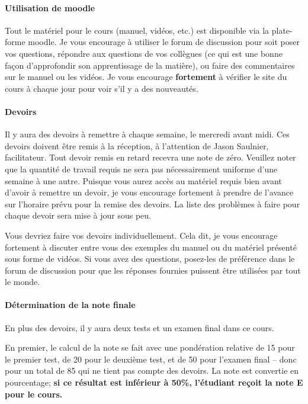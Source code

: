 \documentclass[11pt]{article}
\begin{document}
\paragraph*{Utilisation de moodle}  Tout le matériel pour le cours (manuel, vidéos, etc.) est disponible via la plate-forme moodle. 
Je vous encourage à utiliser le forum de discussion pour soit poser vos questions, répondre aux questions de vos collègues
(ce qui est une bonne façon d'approfondir son apprentissage de la matière), ou faire des commentaires sur le manuel ou les vidéos.
Je vous encourage \textbf{fortement} à vérifier le site du cours à chaque jour pour voir s'il y a des nouveautés.

\paragraph*{Devoirs} Il y aura des devoirs à remettre à chaque semaine, le mercredi avant midi. 
Ces devoirs doivent être remis à la réception, à l'attention de Jason Saulnier, facilitateur.
 Tout devoir remis en retard recevra une note de zéro.   
 Veuillez noter que la quantité de travail requis ne sera pas nécessairement uniforme d'une semaine à une autre.  
 Puisque vous aurez accès au matériel requis bien avant d'avoir à remettre un devoir,
  je vous encourage fortement à prendre de l'avance sur l'horaire prévu pour la remise des devoirs.  
  La liste des problèmes à faire pour chaque devoir sera mise à jour sous peu.

Vous devriez faire vos devoirs individuellement.  Cela dit, je vous encourage fortement à discuter entre vous des exemples du manuel ou
du matériel présenté sous forme de vidéos.   Si vous avez des questions, posez-les de préférence dans le forum de discussion pour que
les réponses fournies puissent être utilisées par tout le monde.

\paragraph*{Détermination de la note finale} En plus des devoirs, il y aura deux tests et un examen final dans ce cours.

En premier, le calcul de la note se fait avec une pondération relative de 15 pour le premier test,
de 20 pour le deuxième test, et de 50 pour l'examen final -- donc pour un total de 85 qui ne tient
pas compte des devoirs.  La note est
convertie en pourcentage; \textbf{si ce résultat est inférieur à 50\%, l'étudiant reçoit la note E pour le cours.}
\end{document}
